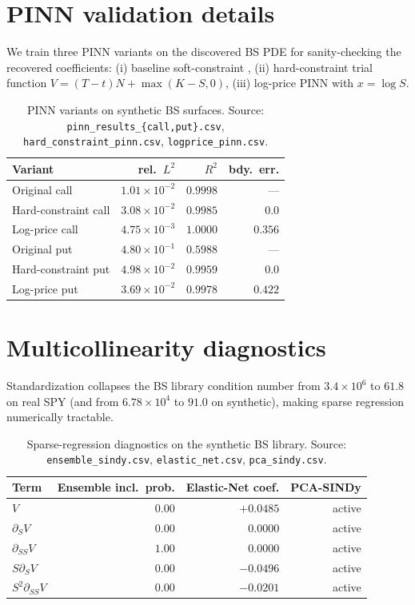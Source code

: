 \documentclass[10pt]{article}
\begin{document}
\section{PINN validation details}\label{app:pinn}
We train three PINN variants on the discovered BS PDE for sanity-checking the recovered coefficients: (i) baseline soft-constraint \citep{raissi2019pinn,lagaris1998artificial}, (ii) hard-constraint trial function $V{=}(T{-}t)N{+}\max(K{-}S,0)$, (iii) log-price PINN with $x{=}\log S$.

\begin{table}[h]
\centering\footnotesize
\caption{PINN variants on synthetic BS surfaces. Source: \texttt{pinn\_results\_\{call,put\}.csv}, \texttt{hard\_constraint\_pinn.csv}, \texttt{logprice\_pinn.csv}.}
\begin{tabular}{lrrr}
\toprule
Variant & rel.\ $L^2$ & $R^2$ & bdy.\ err. \\
\midrule
Original call         & $1.01{\times}10^{-2}$ & $0.9998$ & --- \\
Hard-constraint call  & $3.08{\times}10^{-2}$ & $0.9985$ & $0.0$ \\
Log-price call        & $4.75{\times}10^{-3}$ & $1.0000$ & $0.356$ \\
Original put          & $4.80{\times}10^{-1}$ & $0.5988$ & --- \\
Hard-constraint put   & $4.98{\times}10^{-2}$ & $0.9959$ & $0.0$ \\
Log-price put         & $3.69{\times}10^{-2}$ & $0.9978$ & $0.422$ \\
\bottomrule
\end{tabular}
\end{table}

\section{Multicollinearity diagnostics}\label{app:cond}
Standardization collapses the BS library condition number from $3.4{\times}10^6$ to $61.8$ on real SPY (and from $6.78{\times}10^4$ to $91.0$ on synthetic), making sparse regression numerically tractable.

\begin{table}[h]
\centering\footnotesize
\caption{Sparse-regression diagnostics on the synthetic BS library. Source: \texttt{ensemble\_sindy.csv}, \texttt{elastic\_net.csv}, \texttt{pca\_sindy.csv}.}
\begin{tabular}{lrrr}
\toprule
Term & Ensemble incl.\ prob. & Elastic-Net coef. & PCA-SINDy \\
\midrule
$V$                  & $0.00$ & $+0.0485$ & active \\
$\partial_S V$       & $0.00$ & $0.0000$  & active \\
$\partial_{SS} V$    & $\mathbf{1.00}$ & $0.0000$ & active \\
$S\partial_S V$      & $0.00$ & $-0.0496$ & active \\
$S^2\partial_{SS}V$  & $0.00$ & $-0.0201$ & active \\
\bottomrule
\end{tabular}
\end{table}
\end{document}
